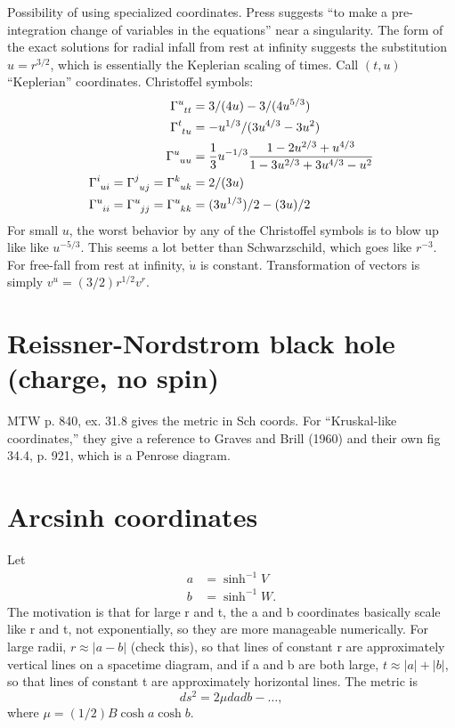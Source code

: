 \documentclass{article}
\begin{document}
Possibility of using specialized coordinates. Press suggests ``to make
a pre-integration change of variables in the equations'' near a singularity.
The form of the exact solutions for radial infall from rest at infinity suggests
the substitution $u=r^{3/2}$, which is essentially the Keplerian scaling of times.
Call $(t,u)$ ``Keplerian'' coordinates. Christoffel symbols:
\begin{align*}
\Gamma\indices{^u_t_t} &= 3/(4u)-3/(4u^{5/3})  \\
\Gamma\indices{^t_t_u} &= -u^{1/3}/(3u^{4/3}-3u^2)  \\
\Gamma\indices{^u_u_u} &= \frac{1}{3}u^{-1/3}\frac{1-2u^{2/3}+u^{4/3}}{1-3u^{2/3}+3u^{4/3}-u^2} \\
\Gamma\indices{^i_u_i} = \Gamma\indices{^j_u_j} = \Gamma\indices{^k_u_k} &= 2/(3u)  \\
\Gamma\indices{^u_i_i} = \Gamma\indices{^u_j_j} = \Gamma\indices{^u_k_k} &= (3u^{1/3})/2-(3u)/2  \\
\end{align*}
For small $u$, the worst behavior by any of the Christoffel symbols is
to blow up like like $u^{-5/3}$. This seems a lot better than
Schwarzschild, which goes like $r^{-3}$. For free-fall from rest at infinity, $\dot{u}$ is
constant. Transformation of vectors is simply
$v^u=(3/2)r^{1/2}v^r$.

\section{Reissner-Nordstrom black hole (charge, no spin)}

MTW p. 840, ex. 31.8 gives the metric in Sch coords. For ``Kruskal-like coordinates,''
they give a reference to Graves and Brill (1960) and their own fig 34.4, p. 921,
which is a Penrose diagram.

\section{Arcsinh coordinates}

Let
\begin{align*}
  a & = \sinh^{-1} V \\
  b & = \sinh^{-1} W. 
\end{align*}
The motivation is that for large r and t, the
a and b coordinates basically scale like r and t, not exponentially, so they are more manageable numerically.
For large radii, $r\approx |a-b|$ (check this), so that lines of constant r are
approximately vertical lines on a spacetime diagram, and if a and b are both large,
$t\approx|a|+|b|$, so that lines of constant t are approximately horizontal lines.
The metric is
\begin{equation*}
  ds^2 = 2\mu dadb -\ldots,
\end{equation*}
where $\mu = (1/2)B\cosh a\cosh b$.
\end{document}
